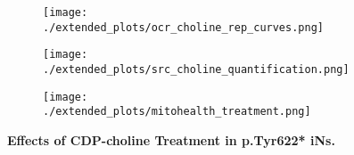 \begin{figure}[H]
\begin{subfigure}[t]{.25\textwidth}
        \caption{}
        \texttt{[image: ./extended\_plots/ocr\_choline\_rep\_curves.png]}        
    \end{subfigure}
    \begin{subfigure}[t]{.22\textwidth}
        \caption{}
        \texttt{[image: ./extended\_plots/src\_choline\_quantification.png]}        
    \end{subfigure}
    \hspace{.25cm}
    \begin{subfigure}[t]{.45\textwidth}
        \caption{}
        \texttt{[image: ./extended\_plots/mitohealth\_treatment.png]}        
    \end{subfigure}
    \caption{
         \textbf{Effects of CDP-choline Treatment in p.Tyr622* iNs.}\\
     }
     \label{fig:choline_treatment}
\end{figure}
